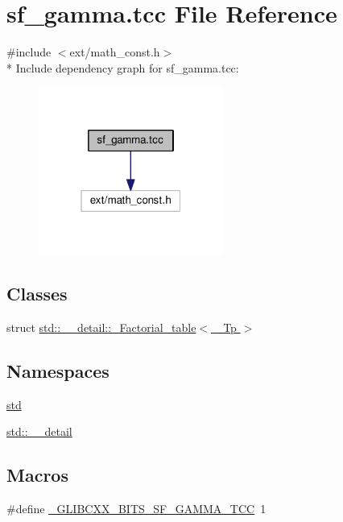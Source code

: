 \hypertarget{sf__gamma_8tcc}{}\section{sf\+\_\+gamma.\+tcc File Reference}
\label{sf__gamma_8tcc}
{\ttfamily \#include $<$ext/math\+\_\+const.\+h$>$}\\*
Include dependency graph for sf\+\_\+gamma.\+tcc\+:\nopagebreak
\begin{figure}[H]
\begin{center}
\leavevmode
\includegraphics[width=172pt]{sf__gamma_8tcc__incl}
\end{center}
\end{figure}
\subsection*{Classes}
\begin{DoxyCompactItemize}
\item 
struct \hyperlink{structstd_1_1____detail_1_1__Factorial__table}{std\+::\+\_\+\+\_\+detail\+::\+\_\+\+Factorial\+\_\+table$<$ \+\_\+\+Tp $>$}
\end{DoxyCompactItemize}
\subsection*{Namespaces}
\begin{DoxyCompactItemize}
\item 
 \hyperlink{namespacestd}{std}
\item 
 \hyperlink{namespacestd_1_1____detail}{std\+::\+\_\+\+\_\+detail}
\end{DoxyCompactItemize}
\subsection*{Macros}
\begin{DoxyCompactItemize}
\item 
\#define \hyperlink{sf__gamma_8tcc_accc383e52e4dc6eebfd313a52961b49b}{\+\_\+\+G\+L\+I\+B\+C\+X\+X\+\_\+\+B\+I\+T\+S\+\_\+\+S\+F\+\_\+\+G\+A\+M\+M\+A\+\_\+\+T\+C\+C}~1
\end{DoxyCompactItemize}
